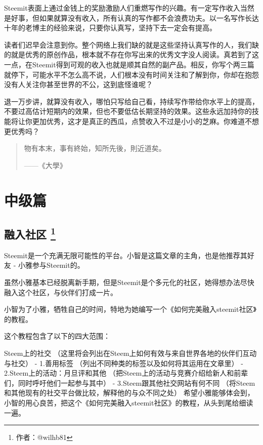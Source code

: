 \documentclass[]{ctexbook}
\begin{document}
Steemit表面上通过金钱上的奖励激励人们重燃写作的兴趣。有一定写作收入当然是好事，但如果就算没有收入，所有认真的写作都不会浪费功夫。以一名写作长达十年的老博主的经验来说，只要你认真写，坚持下去一定会有提高。

读者们迟早会注意到你。整个网络上我们缺的就是这些坚持认真写作的人，我们缺的就是优秀的原创作品，根本就不存在你写出来的优秀文字没人阅读。真若到了这一点，在Steemit得到可观的收入也就是顺其自然的副产品。相反，你写个两三篇就停下，可能水平不怎么高不说，人们根本没有时间关注和了解到你，你却在抱怨没有人关注你甚至世界的不公，这到底怪谁呢？

退一万步讲，就算没有收入，哪怕只写给自己看，持续写作带给你水平上的提高，不要过高估计短期内的效果，但也不要低估长期坚持的效果。这些永远加持你的技能将让你更加优秀，这才是真正的西瓜，点赞收入不过是小小的芝麻。你难道不想更优秀吗？

\begin{quote}
物有本末，事有終始，知所先後，則近道矣。

\begin{flushright}------《大學》\end{flushright}
\end{quote}

\hypertarget{zjp}{%
\part{中级篇}\label{zjp}}

\hypertarget{rrsq}{%
\chapter[融入社区 ]{\texorpdfstring{融入社区 \footnote{作者：@wilhb81}}{融入社区 }}\label{rrsq}}

Steemit是一个充满无限可能性的平台。小智是这篇文章的主角，也是他推荐其好友 - 小雅参与Steemit的。

虽然小雅基本已经脱离新手期，但是Steemit是个多元化的社区，她得想办法尽快融入这个社区，与伙伴们打成一片。

小智为了小雅，牺牲自己的时间，特地为她编写一个《如何完美融入steemit社区》的教程。

这个教程包含了以下的四大范围：

Steem上的社交 （这里将会列出在Steem上如何有效与来自世界各地的伙伴们互动与社交）
- 1.善用标签 （列出不同种类的标签以及如何将其运用在文章里）
- 2.Steem上的活动：月旦评和其他 （把Steem上的活动与竞赛介绍给新人和前辈们，同时呼吁他们一起参与其中）
- 3.Steem跟其他社交网站有何不同 （将Steem和其他现有的社交平台做比较，解释他的与众不同之处）
希望小雅能够体会到，小智的用心良苦，把这个《如何完美融入steemit社区》的教程，从头到尾给细读一遍。
\end{document}
